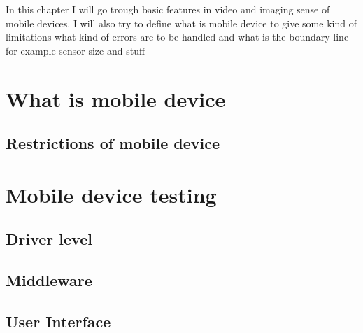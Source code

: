 
In this chapter I will go trough basic features in video and imaging sense of
mobile devices. I will also try to define what is mobile device to give some
kind of limitations what kind of errors are to be handled and what is the
boundary line for example sensor size and stuff

\section{What is mobile device}
\subsection{Restrictions of mobile device}
\section{Mobile device testing}
\subsection{Driver level}
\subsection{Middleware}
\subsection{User Interface}
\subsection{}



